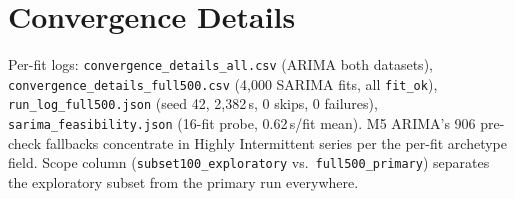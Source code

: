 \section{Convergence Details}
\label{app:conv}
Per-fit logs: \texttt{convergence\_details\_all.csv} (ARIMA both datasets),
\texttt{convergence\_details\_full500.csv} (4,000 SARIMA fits, all
\texttt{fit\_ok}), \texttt{run\_log\_full500.json} (seed 42, 2,382\,s, 0
skips, 0 failures), \texttt{sarima\_feasibility.json} (16-fit probe,
0.62\,s/fit mean). M5 ARIMA's 906 pre-check fallbacks concentrate in Highly
Intermittent series per the per-fit archetype field. Scope column
(\texttt{subset100\_exploratory} vs.\ \texttt{full500\_primary}) separates the
exploratory subset from the primary run everywhere.
